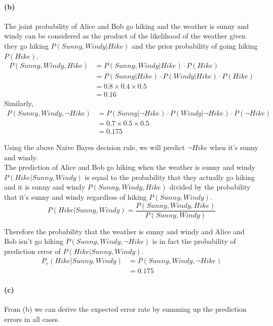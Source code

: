 \documentclass[a4paper]{article}
\begin{document}
\paragraph{(b)} The joint probability of Alice and Bob go hiking and the weather is sunny and windy can be considered as the product of the likelihood of the weather given they go hiking $P(Sunny, Windy | Hike)$ and the prior probability of going hiking $P(Hike)$.\\
	\begin{align}
		P(Sunny, Windy, Hike) &= P(Sunny, Windy | Hike) \cdot P(Hike)\\
			&= P(Sunny | Hike) \cdot P(Windy | Hike) \cdot P(Hike)\\
			&= 0.8 \times 0.4 \times 0.5\\
			&= 0.16
	\end{align}
	Similarly,
	\begin{align}
		P(Sunny, Windy, \neg Hike) &= P(Sunny | \neg Hike) \cdot P(Windy | \neg Hike) \cdot P(\neg Hike)\\
			&= 0.7 \times 0.5 \times 0.5\\
			&= 0.175
	\end{align}
	
	Using the above Naive Bayes decision rule, we will predict $\neg Hike$ when it's sunny and windy.\\
	
	The prediction of Alice and Bob go hiking when the weather is sunny and windy $P(Hike|Sunny, Windy)$ is equal to the probability that they actually go hiking and it is sunny and windy $P(Sunny, Windy, Hike)$ divided by the probability that it's sunny and windy regardless of hiking $P(Sunny, Windy)$.
	$$ P(Hike|Sunny, Windy) = \frac{P(Sunny, Windy, Hike)}{P(Sunny, Windy)} $$
	
	Therefore the probability that the weather is sunny and windy and Alice and Bob isn't go hiking $P(Sunny, Windy, \neg Hike)$ is in fact the probability of prediction error of $P(Hike|Sunny, Windy)$. 
	\begin{align}
		P_e(Hike|Sunny, Windy) &= P(Sunny, Windy,\neg Hike) \\
			&= 0.175
	\end{align}
\paragraph{(c)} From (b) we can derive the expected error rate by summing up the prediction errors in all cases. \\
\end{document}
